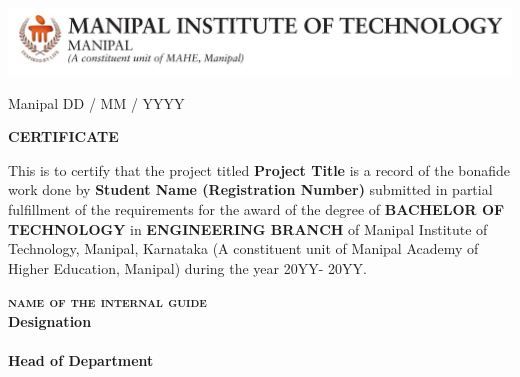 \begin{titlepage}
\thispagestyle{empty}
    \begin{center}
        {\includegraphics[height=0.09\textheight, width=1\textwidth]{figures/mit.jpg}}
    \end{center}
    \begin{flushright}
        \vspace{0.1cm}
        Manipal
        \linebreak
        \vspace{0.5cm}
        DD / MM / YYYY
    \end{flushright} 
    \begin{center}
    \Large{\textbf{\textsc{CERTIFICATE}}}
    \linebreak
    \end{center}
    This is to certify that the project titled \textbf{Project Title} is a record of the bonafide
    work done by \textbf{Student Name (Registration Number)} submitted in partial fulfillment of the
    requirements for the award of the degree of \textbf{BACHELOR OF TECHNOLOGY} in
    \textbf{ENGINEERING BRANCH} of Manipal Institute of Technology, Manipal, Karnataka
    (A constituent unit of Manipal Academy of Higher Education, Manipal) during the year 20YY-
    20YY.
    
    \vspace{7cm}
    \begin{center}
    \begin{multicols}{2}
        \textbf{\textsc{\normalsize{name of the internal guide}}\\
        \footnotesize{Designation}\\
        }
        \columnbreak
        \textbf{\footnotesize{}\\
        \textbf{\footnotesize{Head of Department}}
        }
    \end{multicols}
    \end{center}
\end{titlepage}